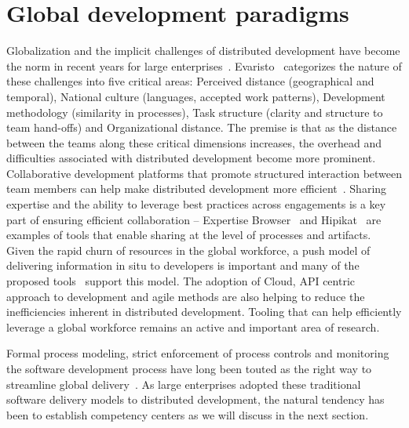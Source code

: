 \section{Global development paradigms}

Globalization and the implicit challenges of distributed development have become the norm in recent years for large enterprises~\cite{glo24,glo26}.  Evaristo~\cite{glo27} categorizes the nature of these challenges into five critical areas: Perceived distance (geographical and temporal), National culture (languages, accepted work patterns), Development methodology (similarity in processes), Task structure (clarity and structure to team hand-offs) and Organizational distance. The premise is that as the distance between the teams along these critical dimensions increases, the overhead and difficulties associated with distributed development become more prominent. Collaborative development platforms that promote structured interaction between team members can help make distributed development more efficient~\cite{glo28,glo29}. Sharing expertise and the ability to leverage best practices across engagements is a key part of ensuring efficient collaboration -- Expertise Browser~\cite{glo30} and Hipikat~\cite{glo31} are examples of tools that enable sharing at the level of processes and artifacts. Given the rapid churn of resources in the global workforce, a push model of delivering information in situ to developers is important and many of the proposed tools~\cite{glo29,glo31,glo34} support this model. The adoption of Cloud, API centric approach to development and agile methods are also helping to reduce the inefficiencies inherent in distributed development. Tooling that can help efficiently leverage a global workforce remains an active and important area of research.

Formal process modeling, strict enforcement of process controls and monitoring the software development process have long been touted as the right way to streamline global delivery~\cite{glo32,glo33,glo34}. As large enterprises adopted these traditional software delivery models  to distributed development, the natural tendency has been to establish competency centers as we will discuss in the next section.

